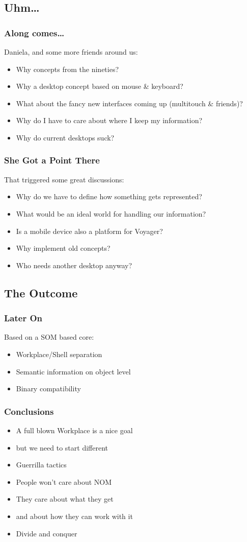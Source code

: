 \documentclass{beamer}
\begin{document}
\subsection{Uhm\ldots}
\begin{frame}
\frametitle{Along comes\ldots}
Daniela, and some more friends around us:
\begin{itemize}
  \item Why concepts from the nineties?
  \item Why a desktop concept based on mouse \& keyboard?
  \item What about the fancy new interfaces coming up (multitouch \& friends)?
  \item Why do I have to care about where I keep my information?
  \item Why do current desktops suck?
\end{itemize}
\end{frame}

\begin{frame}
\frametitle{She Got a Point There\texttrademark}
That triggered some great discussions:
\begin{itemize}
  \item Why do we have to define how something gets represented?
  \item What would be an ideal world for handling our information?
  \item Is a mobile device also a platform for Voyager?
  \item Why implement old concepts?
  \item Who needs another desktop anyway?
\end{itemize}

\end{frame}

\subsection{The Outcome}
\begin{frame}
\frametitle{Later On}
Based on a SOM based core:
\begin{itemize}
  \item Workplace/Shell separation
  \item Semantic information on object level
  \item Binary compatibility
\end{itemize}
\end{frame}

\begin{frame}
\frametitle{Conclusions}
\begin{itemize}[<+->]
  \item A full blown Workplace is a nice goal
  \item but we need to start different
  \item Guerrilla tactics
  \item People won't care about NOM
  \item They care about what they get
  \item and about how they can work with it
  \item Divide and conquer 
\end{itemize}
\end{frame}
\end{document}
